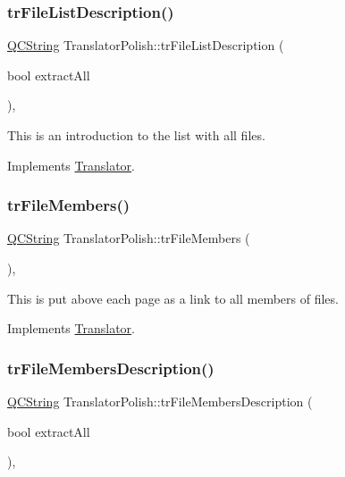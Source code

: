 \subsubsection{\texorpdfstring{trFileListDescription()}{trFileListDescription()}}
{\footnotesize\ttfamily \mbox{\hyperlink{class_q_c_string}{Q\+C\+String}} Translator\+Polish\+::tr\+File\+List\+Description (\begin{DoxyParamCaption}\item[{bool}]{extract\+All }\end{DoxyParamCaption})\hspace{0.3cm}{\ttfamily [inline]}, {\ttfamily [virtual]}}

This is an introduction to the list with all files. 

Implements \mbox{\hyperlink{class_translator}{Translator}}.

\mbox{\label{class_translator_polish_ac61982acc3dc6c319991f92d1667a638}} 
\subsubsection{\texorpdfstring{trFileMembers()}{trFileMembers()}}
{\footnotesize\ttfamily \mbox{\hyperlink{class_q_c_string}{Q\+C\+String}} Translator\+Polish\+::tr\+File\+Members (\begin{DoxyParamCaption}{ }\end{DoxyParamCaption})\hspace{0.3cm}{\ttfamily [inline]}, {\ttfamily [virtual]}}

This is put above each page as a link to all members of files. 

Implements \mbox{\hyperlink{class_translator}{Translator}}.

\mbox{\label{class_translator_polish_a6c1c691bb7e8adf0623f93799e6e78b2}} 
\subsubsection{\texorpdfstring{trFileMembersDescription()}{trFileMembersDescription()}}
{\footnotesize\ttfamily \mbox{\hyperlink{class_q_c_string}{Q\+C\+String}} Translator\+Polish\+::tr\+File\+Members\+Description (\begin{DoxyParamCaption}\item[{bool}]{extract\+All }\end{DoxyParamCaption})\hspace{0.3cm}{\ttfamily [inline]}, {\ttfamily [virtual]}}

